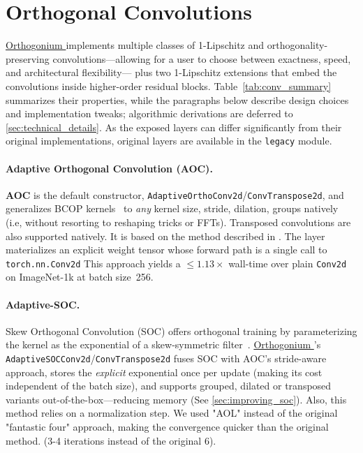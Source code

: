 \documentclass[10pt]{article}
\theoremstyle{plain}
\theoremstyle{definition}
\theoremstyle{remark}
\newcommand{\Orthogonium}{ \href{https://github.com/deel-ai/orthogonium/}{Orthogonium }}
\begin{document}
\section{Orthogonal Convolutions}
\label{sec:conv}
    
    \Orthogonium implements multiple classes of 1-Lipschitz and orthogonality-preserving
    convolutions—allowing for a user to choose between exactness,
    speed, and architectural flexibility— plus two 1-Lipschitz extensions
    that embed the convolutions inside higher-order residual blocks.
    Table~\ref{tab:conv_summary} summarizes their properties, while the paragraphs below describe design choices and implementation tweaks; algorithmic derivations are deferred to \cref{sec:technical_details}. As the exposed layers can differ significantly from their original implementations, original layers are available in the \texttt{legacy} module.
    \paragraph{Adaptive Orthogonal Convolution (AOC).}
    
    \textbf{AOC} is the default constructor, \verb|AdaptiveOrthoConv2d|/\verb|ConvTranspose2d|, and generalizes BCOP kernels~\cite{li_preventing_2019} to \emph{any} kernel size, stride, dilation, groups natively (i.e, without resorting to     reshaping tricks or FFTs). Transposed convolutions are also supported natively. It is based on the method described in \cite{boissin2025adaptive}.  The layer materializes an explicit weight tensor whose forward path is a single call to \verb|torch.nn.Conv2d| This approach yields a \(\le1.13\times\) wall-time over plain \verb|Conv2d| on ImageNet-1k at batch size~256.
       
    \paragraph{Adaptive-SOC.}
    Skew Orthogonal Convolution (SOC) offers orthogonal training by
    parameterizing the kernel as the exponential of a skew-symmetric
    filter~\cite{singla_skew_2021}.  \Orthogonium’s
    \verb|AdaptiveSOCConv2d|/\verb|ConvTranspose2d| fuses SOC with AOC’s
    stride-aware approach, stores the \emph{explicit} exponential once per
    update (making its cost independent of the batch size), and supports grouped, dilated or
    transposed variants out-of-the-box—reducing memory (See \cref{sec:improving_soc}). Also, this method relies on a normalization step. We used "AOL" instead of the original "fantastic four"\cite{singla_fantastic_2021} approach, making the convergence quicker than the original method. (3-4 iterations instead of the original 6).
     
\end{document}
